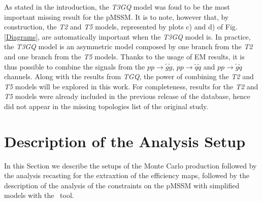 \documentclass[epj,nopacs,fleqn]{svjour}
\begin{document}
%
As stated in the introduction, the \textit{T3GQ} model was foud to be the most important missing result for the pMSSM. It is to note, however that, by construction, the \textit{T2} and \textit{T5} models, represented by plots c) and d) of Fig. \ref{Diagrams}, are automatically important when the \textit{T3GQ} model is. In practice, the \textit{T3GQ} model is an asymmetric model composed by one branch from the \textit{T2} and one branch from the \textit{T5} models. Thanks to the usage of EM results, it is thus possible to combine the signals from the $pp \rightarrow \tilde g \tilde g$, $pp \rightarrow \tilde q \tilde q$ and $pp \rightarrow \tilde g \tilde q$ channels. Along with the results from \textit{TGQ}, the power of combining the \textit{T2} and \textit{T5} models will be explored in this work. For completeness, results for the \textit{T2} and \textit{T5} models were already included in the previous release of the database, hence did not appear in the missing topologies list of the original study.

\section{Description of the Analysis Setup}\label{sec::setup}
In this Section we describe the setups of the Monte Carlo production followed by the analysis recasting for the extraxtion of the efficiency maps, followed by the description of the analysis of the constraints on the pMSSM with simplified models with the \SMO~tool.
\end{document}

